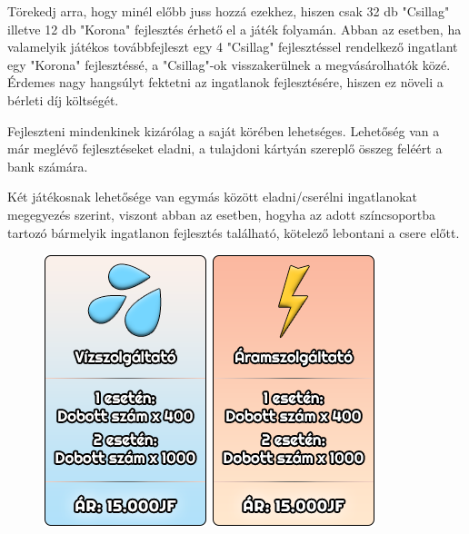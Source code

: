 Törekedj arra, hogy minél előbb juss hozzá ezekhez, hiszen csak 32 db "Csillag" illetve 12 db "Korona" fejlesztés érhető el a játék folyamán. Abban az esetben, ha valamelyik játékos továbbfejleszt egy 4 "Csillag" fejlesztéssel rendelkező ingatlant egy "Korona" fejlesztéssé, a "Csillag"-ok visszakerülnek a megvásárolhatók közé. Érdemes nagy hangsúlyt fektetni az ingatlanok fejlesztésére, hiszen ez növeli a bérleti díj költségét.

Fejleszteni mindenkinek kizárólag a saját körében lehetséges.
Lehetőség van a már meglévő fejlesztéseket eladni, a tulajdoni kártyán szereplő összeg feléért a bank számára.

Két játékosnak lehetősége van egymás között eladni/cserélni ingatlanokat megegyezés szerint, viszont abban az esetben, hogyha az adott színcsoportba tartozó bármelyik ingatlanon fejlesztés található, kötelező lebontani a csere előtt.


\begin{figure}[h!]
\centering
\includegraphics[scale=0.4]{images/vsz.png}
\includegraphics[scale=0.4]{images/asz.png}
\label{fig:ff}
\end{figure}

